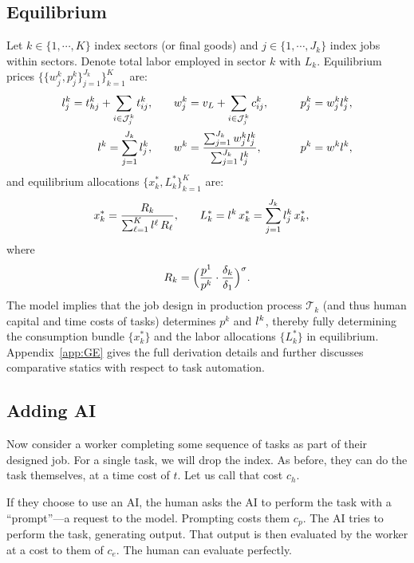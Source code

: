 \documentclass{article}
\theoremstyle{plain}
\theoremstyle{plain}
\begin{document}
\subsection{Equilibrium}
Let $k \in \{1, \cdots, K\}$ index sectors (or final goods) and $j \in \{1,\cdots, J_k \}$ index jobs within sectors.
Denote total labor employed in sector $k$ with $L_k$.
Equilibrium prices $\big\{ \big\{ w_j^k, p_j^k \big\}_{j=1}^{J_k} \big\}_{k=1}^K$ are: 
\begin{align*}
l_{j}^k =  t_{hj}^k + \sum_{i \in \mathcal{J}_j^k} t_{ij}^{k},
& \qquad
w_j^k =  v_L + \sum_{i \in \mathcal{J}_j^k} c_{ij}^{k}, 
& \qquad
p_j^k = w_j^k l_{j}^k, \\
l_{}^k = \sum_{j=1}^{J_k} l_{j}^k,
& \qquad
w^k = \frac{\sum_{j=1}^{J_k} w_j^k l_{j}^k}{\sum_{j=1}^{J_k} l_{j}^k},
& \qquad
p^k = w^k l_{}^k,
\end{align*}
and equilibrium allocations $\big\{ x_k^*, L_k^* \big\}_{k=1}^K$ are:
\begin{align*}
x_k^* = \frac{R_k}{\sum_{\ell=1}^K l_{}^\ell\,R_\ell},
& \qquad
L_k^* = l_{}^k\,x_k^* = \sum_{j=1}^{J_k} l_{j}^k\,x_k^*,
\end{align*}
where
\[
R_k = \Bigl(\frac{p^1}{p^k} \cdot \frac{\delta_k}{\delta_1}\Bigr)^{\sigma}.
\]
The model implies that the job design in production process $\mathcal{T}_k$ (and thus human capital and time costs of tasks) determines $p^k$ and $l_{}^k$, thereby fully determining the consumption bundle $\{x_k^*\}$ and the labor allocations $\{L_k^*\}$ in equilibrium.
Appendix~\ref{app:GE} gives the full derivation details and further discusses comparative statics with respect to task automation.




\subsection{Adding AI} \label{sec:model}
Now consider a worker completing some sequence of tasks as part of their designed job.
For a single task, we will drop the index. 
As before, they can do the task themselves, at a time cost of $t$.
Let us call that cost $c_h$.

If they choose to use an AI, the human asks the AI to perform the task with a ``prompt''---a request to the model. 
Prompting costs them $c_{p}$.
The AI tries to perform the task, generating output.
That output is then evaluated by the worker at a cost to them of $c_{e}$.
The human can evaluate perfectly.
\end{document}
